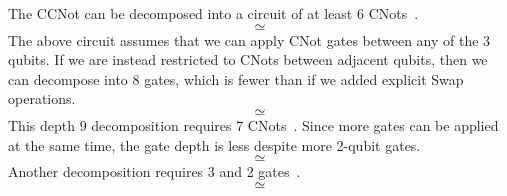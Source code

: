 %

The CCNot can be decomposed into a circuit of at least 6 CNots~\cite{Nielsen2000a}.
$$ \simeq

$$
The above circuit assumes that we can apply CNot gates between any of the 3 qubits. If we are instead restricted to CNots between adjacent qubits, then we can decompose into 8  gates, which is fewer than if we added explicit Swap operations. 
 $$ \simeq

$$
This depth 9 decomposition requires 7 CNots~\cite{Amy2013a}. Since more gates can be applied at the same time, the gate depth is less despite more 2-qubit gates.
$$ \simeq

$$
Another decomposition requires 3  and 2  gates~\cite{???}.
$$ \simeq

$$



